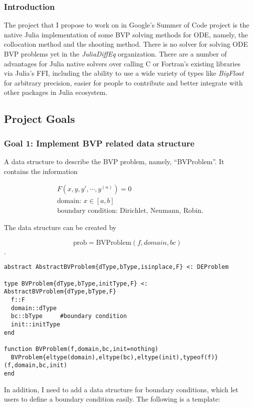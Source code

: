 \documentclass[a4paper,11pt,onecolumn]{article}
\begin{document}
\subsubsection{Introduction} %
\label{ssub:introduction}
The project that I propose to work on in Google's Summer of Code project is the native Julia
implementation of some BVP solving methods for ODE, namely, the collocation method and the shooting method.
There is no solver for solving ODE BVP problems yet in the \textit{JuliaDiffEq} organization. There
are a number of advantages for Julia native solvers over calling C or Fortran's existing libraries
via Julia's FFI, including the ability to use a wide variety of types like \textit{BigFloat} for arbitrary
precision, easier for people to contribute and better integrate with other packages in Julia
ecosystem.

\subsection{Project Goals}
\subsubsection{Goal 1: Implement BVP related data structure}
A data structure to describe the BVP problem, namely, ``BVProblem''. It contains the information

\begin{align*}
	&F(x, y, y', \cdots, y^{(n)}) = 0 \\
	&\text{domain: }x \in [a, b] \\
	&\text{boundary condition: Dirichlet, Neumann, Robin}.
\end{align*}

The data structure can be created by

\[\text{prob} = \text{BVProblem}(f,domain,bc)\].

\begin{lstlisting}[mathescape=true]
abstract AbstractBVProblem{dType,bType,isinplace,F} <: DEProblem

type BVProblem{dType,bType,initType,F} <: AbstractBVProblem{dType,bType,F}
  f::F
  domain::dType
  bc::bType		#boundary condition
  init::initType
end

function BVProblem(f,domain,bc,init=nothing)
  BVProblem{eltype(domain),eltype(bc),eltype(init),typeof(f)}(f,domain,bc,init)
end
\end{lstlisting}

In addition, I need to add a data structure for boundary conditions, which let users to define a
boundary condition easily. The following is a template:
\end{document}
